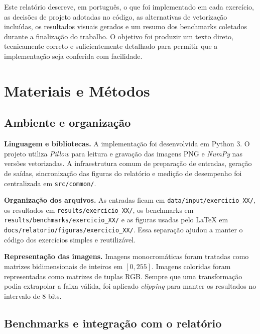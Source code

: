 \documentclass[12pt,a4paper]{article}
\newcommand{\arquivo}[1]{\nolinkurl{#1}}
\newcommand{\campo}[2]{\textbf{#1.} #2\par}
\begin{document}
Este relatório descreve, em português, o que foi implementado em cada exercício, as decisões de projeto adotadas no código, as alternativas de vetorização incluídas, os resultados visuais gerados e um resumo dos benchmarks coletados durante a finalização do trabalho. O objetivo foi produzir um texto direto, tecnicamente correto e suficientemente detalhado para permitir que a implementação seja conferida com facilidade.

\section{Materiais e Métodos}

\subsection{Ambiente e organização}

\campo{Linguagem e bibliotecas}{A implementação foi desenvolvida em Python 3. O projeto utiliza \textit{Pillow} para leitura e gravação das imagens PNG e \textit{NumPy} nas versões vetorizadas. A infraestrutura comum de preparação de entradas, geração de saídas, sincronização das figuras do relatório e medição de desempenho foi centralizada em \arquivo{src/common/}.}
\campo{Organização dos arquivos}{As entradas ficam em \arquivo{data/input/exercicio\_XX/}, os resultados em \arquivo{results/exercicio\_XX/}, os benchmarks em \arquivo{results/benchmarks/exercicio\_XX/} e as figuras usadas pelo \LaTeX{} em \arquivo{docs/relatorio/figuras/exercicio\_XX/}. Essa separação ajudou a manter o código dos exercícios simples e reutilizável.}
\campo{Representação das imagens}{Imagens monocromáticas foram tratadas como matrizes bidimensionais de inteiros em $[0,255]$. Imagens coloridas foram representadas como matrizes de tuplas RGB. Sempre que uma transformação podia extrapolar a faixa válida, foi aplicado \textit{clipping} para manter os resultados no intervalo de 8 bits.}

\subsection{Benchmarks e integração com o relatório}
\end{document}
